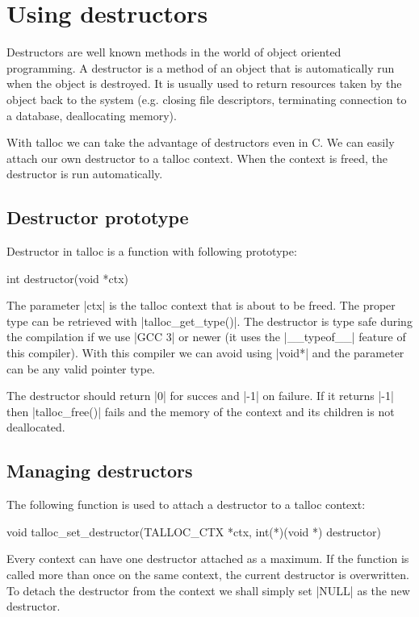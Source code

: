 \section{Using destructors}
\label{talloc:sec:destructors}

Destructors are well known methods in the world of object oriented programming.
A destructor is a method of an object that is automatically run when the object
is destroyed. It is usually used to return resources taken by the object back to
the system (e.g. closing file descriptors, terminating connection to a database,
deallocating memory).

With talloc we can take the advantage of destructors even in C. We can easily
attach our own destructor to a talloc context. When the context is freed, the
destructor is run automatically.

\subsection{Destructor prototype}

Destructor in talloc is a function with following prototype:

\begin{funcproto}
int destructor(void *ctx)
\end{funcproto}
\funclistend
The parameter |ctx| is the talloc context that is about to be freed. The proper
type can be retrieved with |talloc_get_type()|. The destructor is type safe
during the compilation if we use |GCC 3| or newer (it uses the |__typeof__|
feature of this compiler). With this compiler we can avoid using |void*| and the
parameter can be any valid pointer type.

The destructor should return |0| for succes and |-1| on failure. If it returns
|-1| then |talloc_free()| fails and the memory of the context and its children
is not deallocated.

\subsection{Managing destructors}

The following function is used to attach a destructor to a talloc context:

\begin{funcproto}
void talloc_set_destructor(TALLOC_CTX *ctx,
                           int(*)(void *) destructor) 
\end{funcproto}
\funclistend
Every context can have one destructor attached as a maximum. If the function is
called more than once on the same context, the current destructor is
overwritten. To detach the destructor from the context we shall simply set
|NULL| as the new destructor.

